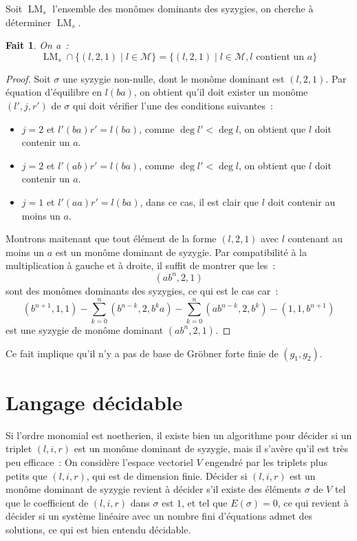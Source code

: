 \documentclass{article}
\newtheorem*{fact}{Fait}
\newcommand{\M}{\mathcal{M}}
\DeclareMathOperator{\LM}{LM}
\begin{document}
Soit $\LM_s$ l'ensemble des monômes dominants des syzygies, on cherche à déterminer $\LM_s$.
\begin{fact}
	On a~:
	$$\LM_s \cap \{(l, 2, 1) \;|\; l \in \M\} = \{(l, 2, 1) \;|\; l \in \M, l \mbox{ contient un } a\}$$
\end{fact}
\begin{proof}
	Soit $\sigma$ une syzygie non-nulle, dont le monôme dominant est $(l, 2, 1)$.
	Par équation d'équilibre en $l(ba)$, on obtient qu'il doit exister un monôme $(l', j, r')$ de $\sigma$ qui doit vérifier l'une des conditions suivantes~:
	\begin{itemize}
	\item $j = 2$ et $l'(ba)r' = l(ba)$, comme $\deg{l'} < \deg{l}$, on obtient que $l$ doit contenir un $a$.
	\item $j = 2$ et $l'(ab)r' = l(ba)$, comme $\deg{l'} < \deg{l}$, on obtient que $l$ doit contenir un $a$.
	\item $j = 1$ et $l'(aa)r' = l(ba)$, dans ce cas, il est clair que $l$ doit contenir au moins un $a$.
	\end{itemize}
	
	Montrons maitenant que tout élément de la forme $(l, 2, 1)$ avec $l$ contenant au moins un $a$ est un monôme dominant de syzygie.
	Par compatibilité à la multiplication à gauche et à droite, il suffit de montrer que les~:
	$$(ab^n, 2, 1)$$
	sont des monômes dominants des syzygies, ce qui est le cas car~:
	$$(b^{n + 1}, 1, 1) - \sum_{k = 0}^n (b^{n - k}, 2, b^k a)
	- \sum_{k = 0}^n (ab^{n - k}, 2, b^k) - (1, 1, b^{n + 1})$$
	est une syzygie de monôme dominant $(ab^n, 2, 1)$.	
\end{proof}

Ce fait implique qu'il n'y a pas de base de Gröbner forte finie de $(g_1, g_2)$.

\section*{Langage décidable}

Si l'ordre monomial est noetherien, il existe bien un algorithme pour décider si un triplet $(l, i, r)$ est un monôme dominant de syzygie, mais il s'avère qu'il est très peu efficace~:
On considère l'espace vectoriel $V$ engendré par les triplets plus petits que $(l, i, r)$, qui est de dimension finie.
Décider si $(l, i, r)$ est un monôme dominant de syzygie revient à décider s'il existe des éléments $\sigma$ de $V$ tel que le coefficient de $(l, i, r)$ dans $\sigma$ est $1$, et tel que $E(\sigma) = 0$, ce qui revient à décider si un système linéaire avec un nombre fini d'équations admet des solutions, ce qui est bien entendu décidable.
\end{document}
